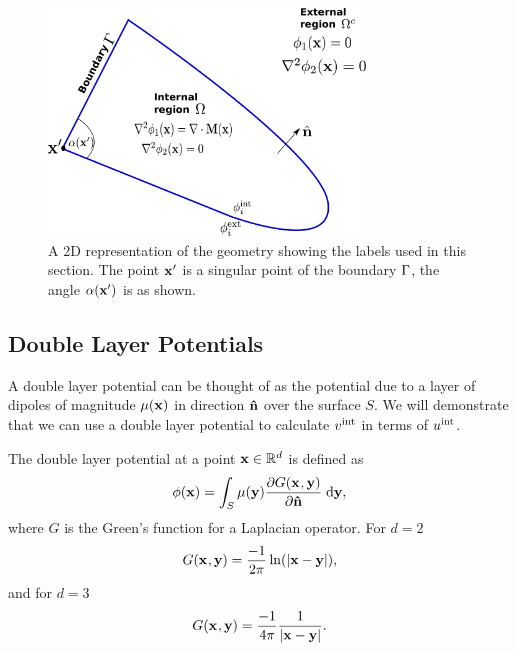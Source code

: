 \begin{figure}
  \center
  \includegraphics[width=0.75\textwidth]{./images/BEM-geometry}




  \caption{A 2D representation of the geometry showing the labels used in this section. The point $\mathbf{x}'$ is a singular point of the boundary ${\Gamma}$, the angle $\alpha(\mathbf{x}')$ is as shown.}
  \label{fig:BEM-geometry}
\end{figure}

\subsection{Double Layer Potentials}
\label{sec:double-layer-potent}
A double layer potential can be thought of as the potential due to a layer of dipoles of magnitude $\mu(\mathbf{x})$ in direction $\mathbf{\hat{n}}$ over the surface $S$.\cite{Sternberg1946} We will demonstrate that we can use a double layer potential to calculate $v^{\text{int}}$ in terms of $u^{\text{int}}$.

The double layer potential at a point $\mathbf{x} \in \mathbb{R}^d$ is defined as \cite{eom_double_layer_potential}
\begin{equation}
  \label{eq:3}
  \phi(\mathbf{x}) = \int_{S} \mu(\mathbf{y}) \frac{\partial G(\mathbf{x}_{},\mathbf{y})}{\partial \mathbf{\hat{n}}} {\; \text{d}} \mathbf{y},
\end{equation}
where $G$ is the Green's function for a Laplacian operator.
For $d=2$
\[ G(\mathbf{x}_{},\mathbf{y}) = \dfrac{-1}{2\pi}\ln(\lvert \mathbf{x} - \mathbf{y} \rvert), \]
and for $d=3$
\begin{equation} G(\mathbf{x}_{},\mathbf{y}) = \dfrac{-1}{4 \pi} \dfrac{1}{\lvert \mathbf{x} - \mathbf{y} \rvert}.
  \label{eqn:greenslaplacian3d}
\end{equation}


